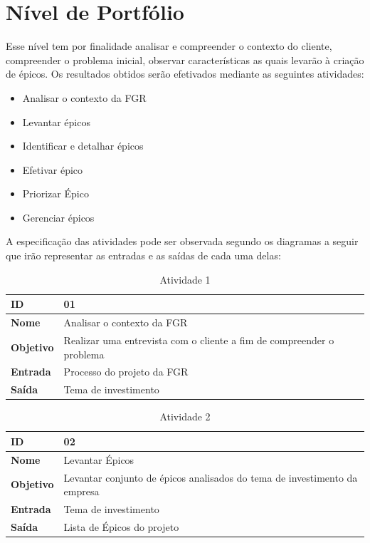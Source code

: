 \section{Nível de Portfólio}
Esse nível tem por finalidade analisar e compreender o contexto do cliente, compreender o problema inicial,
observar características as quais levarão à criação de épicos. Os resultados obtidos serão efetivados mediante
as seguintes atividades:

\begin{itemize}
	\item Analisar o contexto da FGR
	\item Levantar épicos
	\item Identificar e detalhar épicos
	\item Efetivar épico
	\item Priorizar Épico
	\item Gerenciar épicos
\end{itemize}


A especificação das atividades pode ser observada segundo os diagramas a seguir que irão representar as entradas
e as saídas de cada uma delas:


\begin{table}[h]
	\centering
	\caption{Atividade 1}
	\label{my-label}
	\begin{tabular}{|l|l|}
	\hline
	\textbf{ID}       & 01                                                                    \\ \hline
	\textbf{Nome}     & Analisar o contexto da FGR                                            \\ \hline
	\textbf{Objetivo} & Realizar uma entrevista com o cliente a fim de compreender o problema \\ \hline
	\textbf{Entrada}  & Processo do projeto da FGR                                            \\ \hline
	\textbf{Saída}    & Tema de investimento                                                  \\ \hline
	\end{tabular}
\end{table}

\begin{table}[h]
	\centering
	\caption{Atividade 2}
	\label{my-label}
	\begin{tabular}{|l|l|}
		\hline
		\textbf{ID}       & 02                                                                        \\ \hline
		\textbf{Nome}     & Levantar Épicos                                                           \\ \hline
		\textbf{Objetivo} & Levantar conjunto de épicos analisados do tema de investimento da empresa \\ \hline
		\textbf{Entrada}  & Tema de investimento                                                      \\ \hline
		\textbf{Saída}    & Lista de Épicos do projeto                                                \\ \hline
	\end{tabular}
\end{table}

